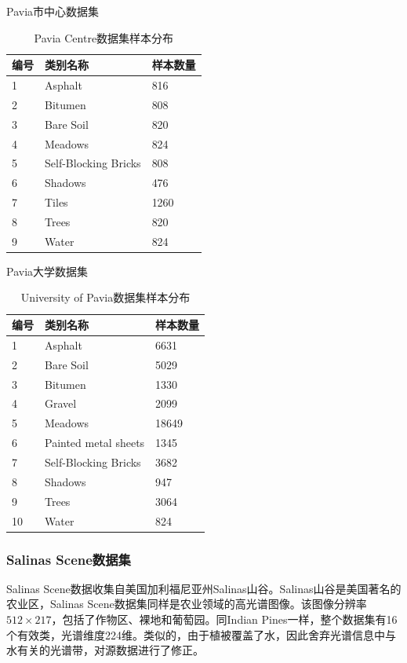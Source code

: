 \documentclass[12pt,a4paper]{article}
\begin{document}
Pavia市中心数据集
\begin{table}[h]
\centering
\caption{Pavia Centre数据集样本分布}\label{tab:PC}
\begin{tabu} to 1\textwidth{X[c]X[10,c]X[3,c]}
\hline
编号 & 类别名称 & 样本数量\\
 & Asphalt & 816 \\
2 & Bitumen & 808 \\
3 & Bare Soil & 820 \\
4 & Meadows & 824 \\
5 & Self-Blocking Bricks & 808 \\
6 & Shadows & 476 \\
7 & Tiles & 1260 \\
8 & Trees & 820 \\
9 & Water & 824 \\
\hline
\end{tabu}
\end{table}

Pavia大学数据集
\begin{table}[h]
\centering
\caption{University of Pavia数据集样本分布}\label{tab:UP}
\begin{tabu} to 1\textwidth{X[c]X[10,c]X[3,c]}
\hline
编号 & 类别名称 & 样本数量\\
 & Asphalt & 6631 \\
2 & Bare Soil & 5029 \\
3 & Bitumen & 1330 \\
4 & Gravel & 2099 \\
5 & Meadows & 18649 \\
6 & Painted metal sheets & 1345 \\
7 & Self-Blocking Bricks & 3682 \\
8 & Shadows & 947 \\
9 & Trees & 3064 \\
10 & Water & 824 \\
\hline
\end{tabu}
\end{table}
\subsubsection{Salinas Scene数据集}
Salinas Scene数据收集自美国加利福尼亚州Salinas山谷。Salinas山谷是美国著名的农业区，Salinas Scene数据集同样是农业领域的高光谱图像。该图像分辨率$512 \times 217$，包括了作物区、裸地和葡萄园。同Indian Pines一样，整个数据集有16个有效类，光谱维度224维。类似的，由于植被覆盖了水，因此舍弃光谱信息中与水有关的光谱带，对源数据进行了修正。
\end{document}
